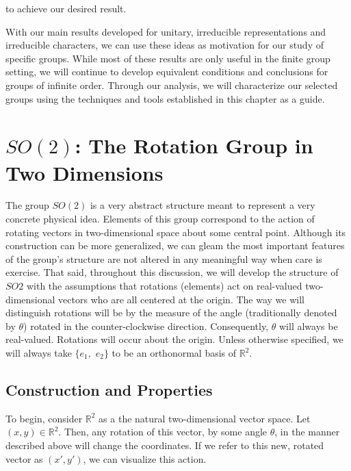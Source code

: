 \documentclass[10pt]{ucthesis}
\newcommand{\R}{\mathbb{R}}
\begin{document}
to achieve our desired result. \cite{Tung} \qedsymbol


With our main results developed for unitary, irreducible representations and irreducible characters, we can use these ideas as motivation for our study of specific groups. While most of these results are only useful in the finite group setting, we will continue to develop equivalent conditions and conclusions for groups of infinite order. Through our analysis, we will characterize our selected groups using the techniques and tools established in this chapter as a guide.



\chapter{$SO(2)$: The Rotation Group in Two Dimensions}

The group $SO(2)$ is a very abstract structure meant to represent a very concrete physical idea. Elements of this group correspond to the action of rotating vectors in two-dimensional space about some central point. Although its construction can be more generalized, we can gleam the most important features of the group's structure are not altered in any meaningful way when care is exercise. That said, throughout this discussion, we will develop the structure of $SO2$ with the assumptions that rotations (elements) act on real-valued two-dimensional vectors who are all centered at the origin. The way we will distinguish rotations will be by the measure of the angle (traditionally denoted by $\theta$) rotated in the counter-clockwise direction. Consequently, $\theta$ will always be real-valued. Rotations will occur about the origin. Unless otherwise specified, we will always take $\{e_1,$ $e_2\}$ to be an orthonormal basis of $\R^2$.

\section{Construction and Properties}

To begin, consider $\R^2$ as a the natural two-dimensional vector space. Let $(x,y)\in\R^2$. Then, any rotation of this vector, by some angle $\theta$, in the manner described above will change the coordinates. If we refer to this new, rotated vector as $(x',y')$, we can visualize this action.

\begin{center}
    \end{center}
\end{document}

